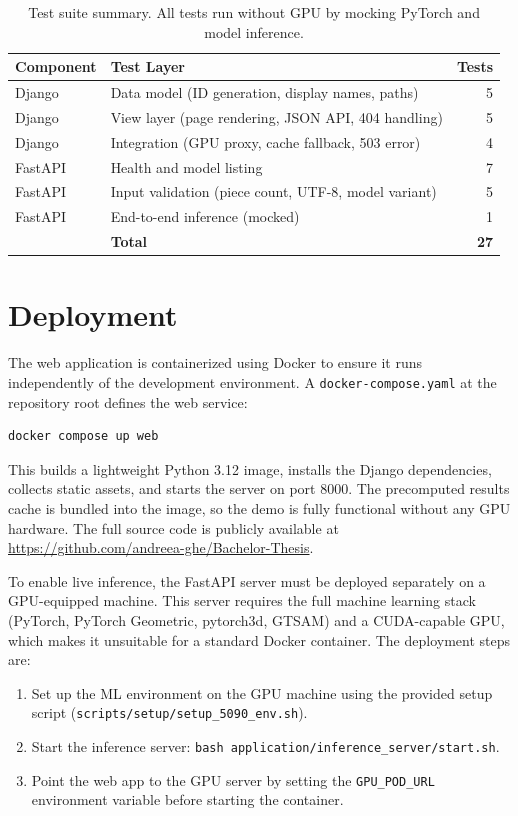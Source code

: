 \begin{table}[H]
\centering
\caption{Test suite summary. All tests run without GPU by mocking PyTorch and model inference.}
\label{tab:test_summary}
\begin{tabular}{llr}
\toprule
\textbf{Component} & \textbf{Test Layer} & \textbf{Tests} \\
\midrule
Django & Data model (ID generation, display names, paths) & 5 \\
Django & View layer (page rendering, JSON API, 404 handling) & 5 \\
Django & Integration (GPU proxy, cache fallback, 503 error) & 4 \\
\midrule
FastAPI & Health and model listing & 7 \\
FastAPI & Input validation (piece count, UTF-8, model variant) & 5 \\
FastAPI & End-to-end inference (mocked) & 1 \\
\midrule
& \textbf{Total} & \textbf{27} \\
\bottomrule
\end{tabular}
\end{table}

\section{Deployment}

The web application is containerized using Docker to ensure it runs independently of the development environment. A \texttt{docker-compose.yaml} at the repository root defines the web service:

\begin{verbatim}
docker compose up web
\end{verbatim}

This builds a lightweight Python 3.12 image, installs the Django dependencies, collects static assets, and starts the server on port 8000. The precomputed results cache is bundled into the image, so the demo is fully functional without any GPU hardware. The full source code is publicly available at \url{https://github.com/andreea-ghe/Bachelor-Thesis}.

To enable live inference, the FastAPI server must be deployed separately on a GPU-equipped machine. This server requires the full machine learning stack (PyTorch, PyTorch Geometric, pytorch3d, GTSAM) and a CUDA-capable GPU, which makes it unsuitable for a standard Docker container. The deployment steps are:

\begin{enumerate}
    \item Set up the ML environment on the GPU machine using the provided setup script (\texttt{scripts/setup/setup\_5090\_env.sh}).
    \item Start the inference server: \texttt{bash application/inference\_server/start.sh}.
    \item Point the web app to the GPU server by setting the \texttt{GPU\_POD\_URL} environment variable before starting the container.
\end{enumerate}

